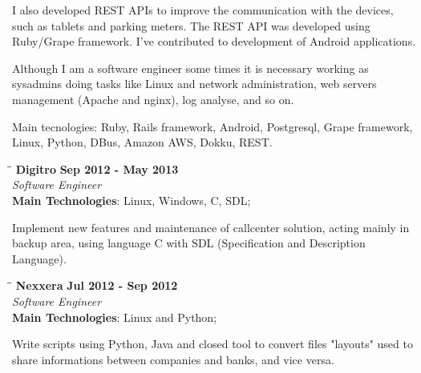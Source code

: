 \documentclass[margin]{res}
\begin{document}
\begin{resume}
I also developed REST APIs to improve the communication with the devices, such as tablets and parking meters. The REST API was developed using Ruby/Grape framework. I've contributed to development of Android applications.

Although I am a software engineer some times it is necessary working as sysadmins doing tasks like Linux and network administration, web servers management (Apache and nginx), log analyse, and so on.

Main tecnologies: Ruby, Rails framework, Android, Postgresql, Grape framework, Linux, Python, DBus, Amazon AWS, Dokku, REST.

\vspace{-0.1in}
   \begin{tabbing}
   \hspace{2.3in}\= \hspace{1.7in}\= \kill %
    \textbf{Digitro}    \>\>\textbf{Sep 2012 - May 2013}\\
    \textit{Software Engineer}\\        
    \textbf{Main Technologies}: Linux, Windows, C, SDL;
   \end{tabbing}\vspace{-20pt}      %
    \vspace{2mm}
Implement new features and maintenance of callcenter solution, acting mainly
in backup area, using language C with SDL (Specification and Description Language).

    
   \begin{tabbing}
   \hspace{2.3in}\= \hspace{1.7in}\= \kill %
    \textbf{Nexxera}    \>\>\textbf{Jul 2012 - Sep 2012}\\
    \textit{Software Engineer}\\   
    \textbf{Main Technologies}: Linux and Python;
   \end{tabbing}\vspace{-20pt}      %
    \vspace{2mm}

    Write scripts using Python, Java and closed tool to convert files "layouts" used to share informations between companies and banks, and vice versa.
   

\end{resume}
\end{document}
